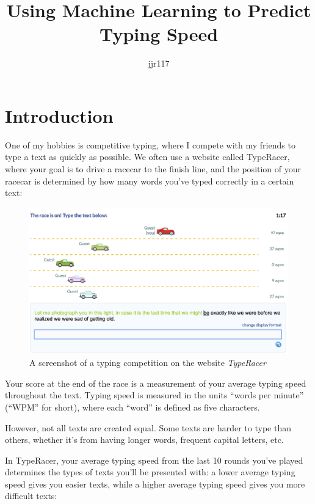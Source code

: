 \documentclass[12pt]{article}
\title{Using Machine Learning to Predict Typing Speed}
\author{jjr117}
\date{}
\begin{document}
\maketitle

\section*{Introduction}

One of my hobbies is competitive typing, where I compete with my friends to type a text as quickly as possible. We often use a website called TypeRacer, where your goal is to drive a racecar to the finish line, and the position of your racecar is determined by how many words you've typed correctly in a certain text:

\begin{figure}[H]
	\includegraphics[width=\textwidth]{typeracer.png}
	\caption{A screenshot of a typing competition on the website \textit{TypeRacer}}
\end{figure}

Your score at the end of the race is a measurement of your average typing speed throughout the text. Typing speed is measured in the units ``words per minute'' (``WPM'' for short), where each ``word'' is defined as five characters.

However, not all texts are created equal. Some texts are harder to type than others, whether it's from having longer words, frequent capital letters, etc.

In TypeRacer, your average typing speed from the last 10 rounds you've played determines the types of texts you'll be presented with: a lower average typing speed gives you easier texts, while a higher average typing speed gives you more difficult texts:
\end{document}
